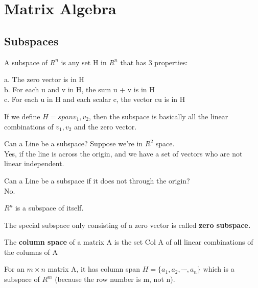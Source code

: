 \chapter{Matrix Algebra}

\section{Subspaces}

\begin{definition}
    A subspace of \(R^n\) is any set H in \(R^n\) that has 3 properties:

    a. The zero vector is in H \\ 
    b. For each u and v in H, the sum u + v is in H
    \\
    c. For each u in H and each scalar c, the vector cu is in H
\end{definition}

If we define \(H = span{v_1, v_2}\), then the subspace is basically all the linear combinations of \(v_1, v_2\) and the zero vector.

\begin{eg}
Can a Line be a subspace? Suppose we're in \(R^2\) space.
\\
Yes, if the line is across the origin, and we have a set of vectors who are not linear independent.
\end{eg}

\begin{eg}
Can a Line be a subspace if it does not through the origin?
\\
No.
\end{eg}

\begin{remark}
    \(R^n\)  is a subspace of itself.
\end{remark}

\begin{remark}
    The special subspace only consisting of a zero vector is called \bf{zero subspace}.
\end{remark}

\begin{definition}
    The \textbf{column space} of a matrix A is the set Col A of all linear combinations of the columns of A 
\end{definition}

For an \(m \times n\) matrix A, it has column span \(H = \{a_1, a_2, \cdots, a_n\}\) which is a subspace of \(R^m\) (because the row number is m, not n).  

